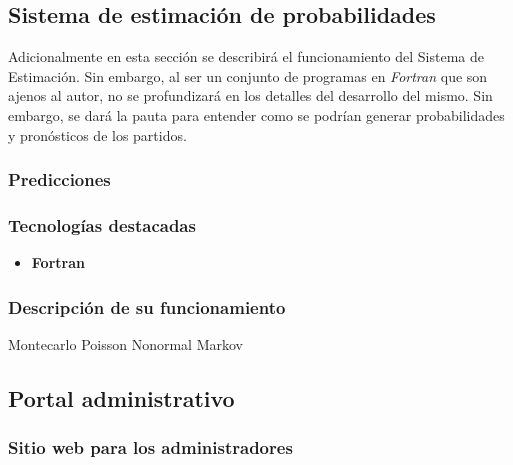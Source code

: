 \begin{enumerate}
\end{enumerate}













\subsection{Sistema de estimación de probabilidades}
Adicionalmente en esta sección se describirá el funcionamiento del Sistema de Estimación. Sin embargo, al ser un conjunto de programas en \emph{Fortran} que son ajenos al autor, no se profundizará en los detalles del desarrollo del mismo. Sin embargo, se dará la pauta para entender como se podrían generar probabilidades y pronósticos de los partidos.

\subsubsection{Predicciones}



\cite{rue2000prediction}

\cite{baio2010bayesian}

\cite{dixon2004value}

\cite{koopman2013dynamic}

 \subsubsection{Tecnologías destacadas}

\begin{itemize}
	\item \textbf{Fortran}
	\cite{robison1996c++}
	\cite{veldhuizen1997will}
\end{itemize}
	
\subsubsection{Descripción de su funcionamiento}

Montecarlo
Poisson
Nonormal
Markov


\subsection{Portal administrativo}

\subsubsection{Sitio web para los administradores}

